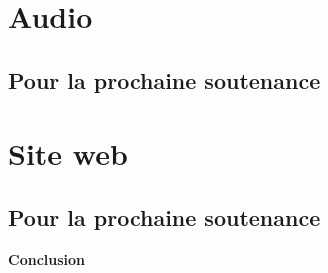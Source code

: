 \documentclass[11pt]{report}
\begin{document}
\newpage
\section{Audio}

\subsection{Pour la prochaine soutenance}

\newpage
\section{Site web}

\subsection{Pour la prochaine soutenance}

\newpage
\textbf{{\huge Conclusion}} \vspace{7mm}

\newpage
\listoffigures 
 
\end{document}
